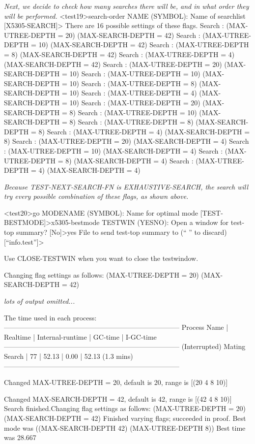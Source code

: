 \begin{tpsexample}
{\it Next, we decide to check how many searches there will be, and in what
order they will be performed.}
<test19>search-order
NAME (SYMBOL): Name of searchlist [X5305-SEARCH]>
There are 16 possible settings of these flags.
Search : (MAX-UTREE-DEPTH = 20) (MAX-SEARCH-DEPTH = 42)
Search : (MAX-UTREE-DEPTH = 10) (MAX-SEARCH-DEPTH = 42)
Search : (MAX-UTREE-DEPTH = 8) (MAX-SEARCH-DEPTH = 42)
Search : (MAX-UTREE-DEPTH = 4) (MAX-SEARCH-DEPTH = 42)
Search : (MAX-UTREE-DEPTH = 20) (MAX-SEARCH-DEPTH = 10)
Search : (MAX-UTREE-DEPTH = 10) (MAX-SEARCH-DEPTH = 10)
Search : (MAX-UTREE-DEPTH = 8) (MAX-SEARCH-DEPTH = 10)
Search : (MAX-UTREE-DEPTH = 4) (MAX-SEARCH-DEPTH = 10)
Search : (MAX-UTREE-DEPTH = 20) (MAX-SEARCH-DEPTH = 8)
Search : (MAX-UTREE-DEPTH = 10) (MAX-SEARCH-DEPTH = 8)
Search : (MAX-UTREE-DEPTH = 8) (MAX-SEARCH-DEPTH = 8)
Search : (MAX-UTREE-DEPTH = 4) (MAX-SEARCH-DEPTH = 8)
Search : (MAX-UTREE-DEPTH = 20) (MAX-SEARCH-DEPTH = 4)
Search : (MAX-UTREE-DEPTH = 10) (MAX-SEARCH-DEPTH = 4)
Search : (MAX-UTREE-DEPTH = 8) (MAX-SEARCH-DEPTH = 4)
Search : (MAX-UTREE-DEPTH = 4) (MAX-SEARCH-DEPTH = 4)

{\it Because TEST-NEXT-SEARCH-FN is EXHAUSTIVE-SEARCH, the search will try
every possible combination of these flags, as shown above.}

<test20>go
MODENAME (SYMBOL): Name for optimal mode [TEST-BESTMODE]>x5305-bestmode
TESTWIN (YESNO): Open a window for test-top summary? [No]>yes
File to send test-top summary to (`` '' to discard) [``info.test'']>

Use CLOSE-TESTWIN when you want to close the testwindow.

Changing flag settings as follows:
(MAX-UTREE-DEPTH = 20) (MAX-SEARCH-DEPTH = 42)

{\it lots of output omitted...}

The time used in each process:
-----------------------------------------------------------------------------
Process Name         | Realtime | Internal-runtime |  GC-time   | I-GC-time
-----------------------------------------------------------------------------
                                (Interrupted)
Mating Search        |       77 |            52.13 |       0.00 |      52.13
                      (1.3 mins)
-----------------------------------------------------------------------------

Changed MAX-UTREE-DEPTH = 20, default is 20, range is [(20 4 8 10)]

Changed MAX-SEARCH-DEPTH = 42, default is 42, range is [(42 4 8 10)]
Search finished.Changing flag settings as follows:
(MAX-UTREE-DEPTH = 20) (MAX-SEARCH-DEPTH = 42)
Finished varying flags; succeeded in proof.
Best mode was ((MAX-SEARCH-DEPTH 42) (MAX-UTREE-DEPTH 8))
Best time was 28.667


\end{tpsexample}

